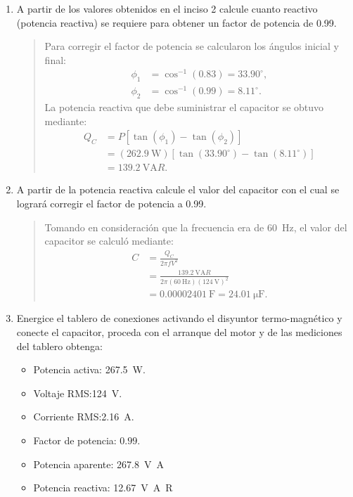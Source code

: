 \documentclass[12pt,a4paper]{article}
\begin{document}
\begin{enumerate}
    \item A partir de los valores obtenidos en el inciso 2 calcule cuanto reactivo (potencia reactiva) se requiere para obtener un factor de potencia de 0.99.
    
    \begin{quote}
        Para corregir el factor de potencia se calcularon los ángulos inicial y final:
        \begin{align*}
            \phi_1 &= \cos^{-1}(0.83)=33.90^\circ,\\
            \phi_2 &= \cos^{-1}(0.99)=8.11^\circ.
        \end{align*}
        La potencia reactiva que debe suministrar el capacitor se obtuvo mediante:
        \begin{align*}
            Q_C &= P\left[\tan(\phi_1)-\tan(\phi_2)\right] \\
                &= (\SI{262.9}{\watt})\left[\tan(33.90^\circ)-\tan(8.11^\circ)\right] \\
                &= \SI{139.2}{\volt\ampere{R}}.
        \end{align*}
    \end{quote}

    \item A partir de la potencia reactiva calcule el valor del capacitor con el cual se logrará corregir el factor de potencia a 0.99.
    \begin{quote}
        Tomando en consideración que la frecuencia era de \SI{60}{\hertz}, el valor del capacitor se calculó mediante:
        \begin{align*}
            C &= \frac{Q_C}{2\pi fV^2} \\
              &= \frac{\SI{139.2}{\volt\ampere{R}}}{2\pi(\SI{60}{\hertz}){(\SI{124}{\volt})}^2} \\
              &= \SI{0.00002401}{\farad} = \SI{24.01}{\micro\farad}.
        \end{align*}
    \end{quote}

    \item Energice el tablero de conexiones activando el disyuntor termo-magnético y conecte el capacitor, proceda con el arranque del motor y de las mediciones del tablero obtenga:
    \begin{itemize}
        \item Potencia activa: \SI{267.5}{\watt}.
        \item Voltaje RMS:\@ \SI{124}{\volt}.
        \item Corriente RMS:\@ \SI{2.16}{\ampere}.
        \item Factor de potencia: $0.99$.
        \item Potencia aparente: \SI{267.8}{\volt\ampere}
        \item Potencia reactiva: \SI{12.67}{\volt\ampere{R}}
    \end{itemize}


\end{enumerate}
\end{document}
